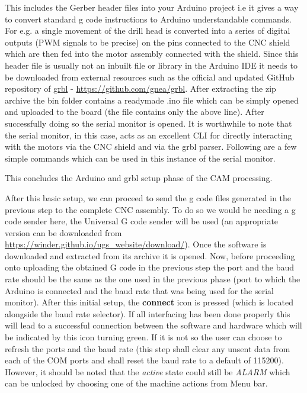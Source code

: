 This includes the Gerber header files into your Arduino project i.e it gives a way to convert standard g code instructions to Arduino understandable commands. For e.g. a single movement of the drill head is converted into a series of digital outputs (PWM signals to be precise) on the pins connected to the CNC shield which are then fed into the motor assembly connected with the shield. Since this header file is usually not an inbuilt file or library in the Arduino IDE it needs to be downloaded from external resources such as the official and updated GitHub repository of \href{https://github.com/gnea/grbl}{grbl} - \url{https://github.com/gnea/grbl}. After extracting the zip archive the bin folder contains a readymade .ino file which can be simply opened and uploaded to the board (the file contains only the above line). After successfully doing so the serial monitor is opened. It is worthwhile to note that the serial monitor, in this case, acts as an excellent CLI for directly interacting with the motors via the CNC shield and via the grbl parser. Following are a few simple commands which can be used in this instance of the serial monitor. \par


This concludes the Arduino and grbl setup phase of the CAM processing.

After this basic setup, we can proceed to send the g code files generated in the previous step to the complete CNC assembly. To do so we would be needing a g code sender here, the Universal G code sender will be used (an appropriate version can be downloaded from \url{https://winder.github.io/ugs_website/download/}). Once the software is downloaded and extracted from its archive it is opened. Now, before proceeding onto uploading the obtained G code in the previous step the port and the baud rate should be the same as the one used in the previous phase (port to which the Arduino is connected and the baud rate that was being used for the serial monitor). After this initial setup, the \textbf{connect} icon is pressed (which is located alongside the baud rate selector). If all interfacing has been done properly this will lead to a successful connection between the software and hardware which will be indicated by this icon turning green. If it is not so the user can choose to refresh the ports and the baud rate (this step shall clear any unsent data from each of the COM ports and shall reset the baud rate to a default of 115200). However, it should be noted that the \textit{active} state could still be \textit{ALARM} which can be unlocked by choosing one of the machine actions from Menu bar. \par

